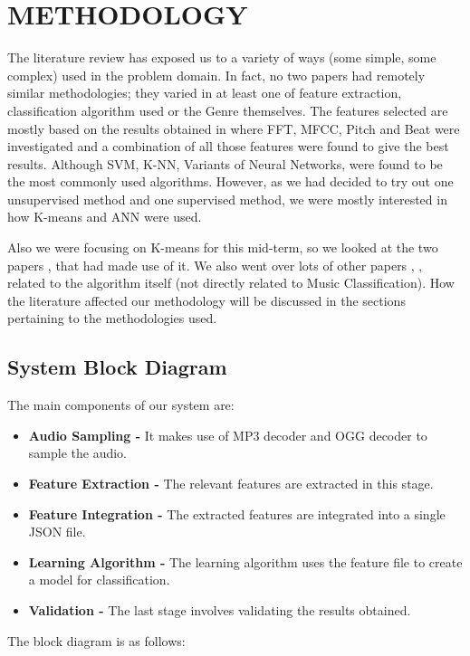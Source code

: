 \newpage
\section{METHODOLOGY}

The literature review has exposed us to a variety of ways (some simple, some complex) used in the problem domain. In fact, no two papers had remotely similar
methodologies; they varied in at least one of feature extraction, classification algorithm used or the Genre themselves.
The features selected are mostly based on the results obtained in \cite{LiTao2003} where FFT, MFCC, Pitch and Beat were investigated and a
combination of all those features were found to give the best results. 
Although SVM, K-NN, Variants of Neural Networks, were found to be the most commonly used algorithms. However, as we had decided to try out one unsupervised
method and one supervised method, we were mostly interested in how K-means and ANN were used.
\par Also we were focusing on K-means for this mid-term, so we looked at the two papers \cite{Haggblade2011}, \cite{Tzanetakis1992} that had made use of it. We also
went over lots of other papers \cite{Apon2006}, \cite{Jain2010}, \cite{Hamerly2002} related to the algorithm itself (not directly related to Music Classification). How
the literature affected our methodology will be discussed in the sections pertaining to the methodologies used.  

\subsection{System Block Diagram}
The main components of our system are:
\begin{itemize}
        \item\textbf{Audio Sampling - }It makes use of MP3 decoder and OGG decoder to sample the audio.  
        \item\textbf{Feature Extraction - }The relevant features are extracted in this stage.
        \item\textbf{Feature Integration - }The extracted features are integrated into a single JSON file.
        \item\textbf{Learning Algorithm - }The learning algorithm uses the feature file to create a model for classification.
        \item\textbf{Validation - }The last stage involves validating the results obtained.
\end{itemize}
\newpage
The block diagram is as follows:

